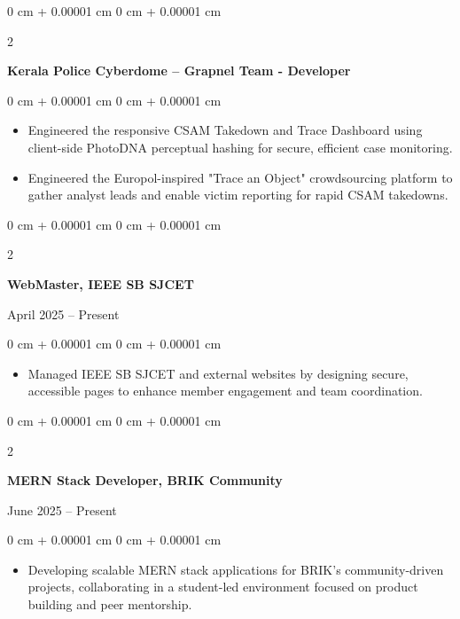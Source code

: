\documentclass[10pt, a4paper]{article}
\newenvironment{highlights}{
    \begin{itemize}[
        topsep=0.10 cm,
        parsep=0.10 cm,
        partopsep=0pt,
        itemsep=0pt,
        leftmargin=0 cm + 10pt
    ]
}{
    \end{itemize}
} %
\newenvironment{onecolentry}{
    \begin{adjustwidth}{
        0 cm + 0.00001 cm
    }{
        0 cm + 0.00001 cm
    }
}{
    \end{adjustwidth}
} %
\newenvironment{twocolentry}[2][]{
    \onecolentry
    \def\secondColumn{#2}
    \setcolumnwidth{\fill, 4.5 cm}
    \begin{paracol}{2}
}{
    \switchcolumn \raggedleft \secondColumn
    \end{paracol}
    \endonecolentry
} %
\begin{document}
\begin{twocolentry}{
}
    \textbf{Kerala Police Cyberdome – Grapnel Team - Developer}
\end{twocolentry}

\vspace{0.10 cm}
\begin{onecolentry}
    \begin{highlights}
        \item Engineered the responsive CSAM Takedown and Trace Dashboard using client-side PhotoDNA perceptual hashing for secure, efficient case monitoring.
        \item Engineered the Europol-inspired "Trace an Object" crowdsourcing platform to gather analyst leads and enable victim reporting for rapid CSAM takedowns.
    \end{highlights}
\end{onecolentry}

    \vspace{0.2 cm}

\begin{twocolentry}{
    April 2025 – Present
}
    \textbf{WebMaster, IEEE SB SJCET}
\end{twocolentry}

\vspace{0.10 cm}
\begin{onecolentry}
    \begin{highlights}
        \item Managed IEEE SB SJCET and external websites by designing secure, accessible pages to enhance member engagement and team coordination.
    \end{highlights}
\end{onecolentry}

    \vspace{0.2 cm}
    
\begin{twocolentry}{
    June 2025 – Present 
}
    \textbf{MERN Stack Developer, BRIK Community}
\end{twocolentry}

\vspace{0.10 cm}
\begin{onecolentry}
    \begin{highlights}
        \item Developing scalable MERN stack applications for BRIK’s community-driven projects, collaborating in a student-led environment focused on product building and peer mentorship.
    \end{highlights}
\end{onecolentry}
\end{document}
